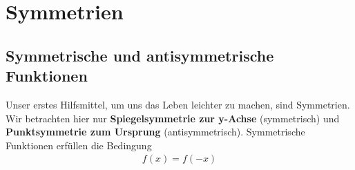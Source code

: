 \section{Symmetrien}
\subsection{Symmetrische und antisymmetrische Funktionen}

Unser erstes Hilfsmittel, um uns das Leben leichter zu machen, sind Symmetrien. Wir betrachten hier nur \textbf{Spiegelsymmetrie zur y-Achse} (symmetrisch) und \textbf{Punktsymmetrie zum Ursprung} (antisymmetrisch). Symmetrische Funktionen erfüllen die Bedingung
\begin{align}
f(x) = f(-x)
\label{sym}
\end{align}

